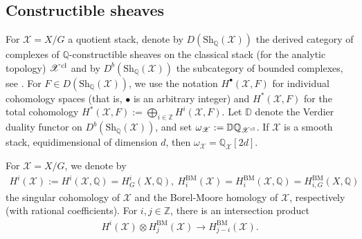 \documentclass [11pt,oneside,a4paper,mathscr]{amsart}
\theoremstyle{definition}
\newcommand{\X}{\mathscr{X}}
\begin{document}
\subsection{Constructible sheaves}\label{subsectionconshvs}
For $\X=X/G$ a quotient stack, denote by
$D(\mathrm{Sh}_{\mathbb{Q}}(\X))$ the derived 
category of complexes of $\mathbb{Q}$-constructible sheaves on the classical stack (for the analytic topology) $\X^{\rm{cl}}$ and by $D^b(\mathrm{Sh}_{\mathbb{Q}}(\X))$ the subcategory of bounded complexes, see \cite{MR2312554}. 
For $F\in D(\mathrm{Sh}_{\mathbb{Q}}(\X))$, we use the notation $H^\bullet(\X, F)$ for individual cohomology spaces (that is, $\bullet$ is an arbitrary integer) and $H^{\ast}(\X, F)$ for the total cohomology $H^{\ast}(\X, F):=\bigoplus_{i\in\mathbb{Z}} H^i(\X, F)$. 
Let $\mathbb{D}$ denote the Verdier duality functor on $D^b(\mathrm{Sh}_{\mathbb{Q}}(\X))$, and set $\omega_\X:=\mathbb{D}\mathbb{Q}_{\X^{\rm{cl}}}$. If $\X$ is a smooth stack, equidimensional of dimension $d$, then $\omega_\X=\mathbb{Q}_\X[2d]$.

For $\X=X/G$, we denote by 
\begin{align*}
 H^i(\X):=H^i(\X, \mathbb{Q})=H^i_G(X, \mathbb{Q}), \ 
 H^{\mathrm{BM}}_i(\X)=H^{\mathrm{BM}}_i(\X, \mathbb{Q})=H^{\mathrm{BM}}_{i, G}(X, \mathbb{Q})
 \end{align*}
 the singular cohomology of $\X$ and 
 the Borel-Moore homology of $\X$, 
 respectively (with rational coefficients). 
For $i, j \in \mathbb{Z}$, there
is an intersection product \begin{align}\label{intersect}H^i(\X)\otimes H^{\mathrm{BM}}_j(\X)\to H^{\mathrm{BM}}_{j-i}(\X). 
\end{align} 
\end{document}

